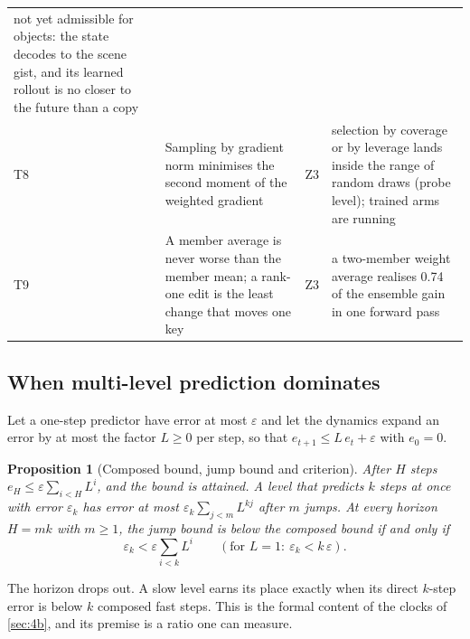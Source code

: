 \documentclass[10pt,twocolumn]{article}
\newtheorem{proposition}{Proposition}
\theoremstyle{remark}
\begin{document}
\begin{table}[t]
\begin{tabularx}{\textwidth}{@{}l>{\raggedright\arraybackslash}p{60mm}l>{\raggedright\arraybackslash}X@{}}
not yet admissible for objects: the state decodes to the scene gist, and its learned rollout is no closer to the future than a copy \\
T8 & Sampling by gradient norm minimises the second moment of the weighted gradient & Z3 &
selection by coverage or by leverage lands inside the range of random draws (probe level); trained arms are running \\
T9 & A member average is never worse than the member mean; a rank-one edit is the least change that moves one key & Z3 &
a two-member weight average realises 0.74 of the ensemble gain in one forward pass \\
\bottomrule
\end{tabularx}
\end{table}

\subsection{When multi-level prediction dominates}
Let a one-step predictor have error at most $\varepsilon$ and let the dynamics expand an error by at most the factor $L\ge0$ per
step, so that $e_{t+1}\le L\,e_t+\varepsilon$ with $e_0=0$.
\begin{proposition}[Composed bound, jump bound and criterion]\label{prop:jump}
After $H$ steps $e_H\le\varepsilon\sum_{i<H}L^{i}$, and the bound is attained. A level that predicts $k$ steps at once with error
$\varepsilon_k$ has error at most $\varepsilon_k\sum_{j<m}L^{kj}$ after $m$ jumps. At every horizon $H=mk$ with $m\ge1$, the jump bound
is below the composed bound if and only if
\begin{equation}
\varepsilon_k<\varepsilon\sum_{i<k}L^{i}\qquad(\text{for }L=1:\ \varepsilon_k<k\,\varepsilon).\label{eq:jump}
\end{equation}
\end{proposition}
\noindent The horizon drops out. A slow level earns its place exactly when its direct $k$-step error is below $k$ composed fast
steps. This is the formal content of the clocks of \cref{sec:4b}, and its premise is a ratio one can measure.
\end{document}
